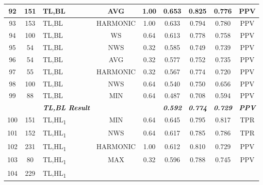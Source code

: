 \begin{table}[H]
{\begin{tabular}{cc|l|cc|c|c|c|c|}
  \multicolumn{1}{|c|}{92} &
    151 &
    TL,BL &
    \multicolumn{1}{c|}{AVG} &
    1.00 &
    0.653 &
    0.825 &
    0.776 &
    PPV \\ \hline
  \multicolumn{1}{|c|}{93} &
    153 &
    TL,BL &
    \multicolumn{1}{c|}{HARMONIC} &
    1.00 &
    0.633 &
    0.794 &
    0.780 &
    PPV \\ \hline
  \multicolumn{1}{|c|}{94} &
    100 &
    TL,BL &
    \multicolumn{1}{c|}{WS} &
    0.64 &
    0.613 &
    0.778 &
    0.758 &
    PPV \\ \hline
  \multicolumn{1}{|c|}{95} &
    54 &
    TL,BL &
    \multicolumn{1}{c|}{NWS} &
    0.32 &
    0.585 &
    0.749 &
    0.739 &
    PPV \\ \hline
  \multicolumn{1}{|c|}{96} &
    54 &
    TL,BL &
    \multicolumn{1}{c|}{AVG} &
    0.32 &
    0.577 &
    0.752 &
    0.735 &
    PPV \\ \hline
  \multicolumn{1}{|c|}{97} &
    55 &
    TL,BL &
    \multicolumn{1}{c|}{HARMONIC} &
    0.32 &
    0.567 &
    0.774 &
    0.720 &
    PPV \\ \hline
  \multicolumn{1}{|c|}{98} &
    100 &
    TL,BL &
    \multicolumn{1}{c|}{NWS} &
    0.64 &
    0.540 &
    0.750 &
    0.656 &
    PPV \\ \hline
  \multicolumn{1}{|c|}{99} &
    88 &
    TL,BL &
    \multicolumn{1}{c|}{MIN} &
    0.64 &
    0.487 &
    0.708 &
    0.594 &
    PPV \\ \hline
   &
     &
    \textit{\textbf{TL,BL Result}} &
     &
     &
    \textit{\textbf{0.592}} &
    \textit{\textbf{0.774}} &
    \textit{\textbf{0.729}} &
    \textit{\textbf{PPV}} \\ \hline
  \multicolumn{1}{|c|}{100} &
    151 &
    TL,HL\textsubscript{1} &
    \multicolumn{1}{c|}{MIN} &
    0.64 &
    0.645 &
    0.795 &
    0.817 &
    TPR \\ \hline
  \multicolumn{1}{|c|}{101} &
    152 &
    TL,HL\textsubscript{1} &
    \multicolumn{1}{c|}{NWS} &
    0.64 &
    0.617 &
    0.785 &
    0.786 &
    TPR \\ \hline
  \multicolumn{1}{|c|}{102} &
    231 &
    TL,HL\textsubscript{1} &
    \multicolumn{1}{c|}{HARMONIC} &
    1.00 &
    0.612 &
    0.810 &
    0.729 &
    PPV \\ \hline
  \multicolumn{1}{|c|}{103} &
    80 &
    TL,HL\textsubscript{1} &
    \multicolumn{1}{c|}{MAX} &
    0.32 &
    0.596 &
    0.788 &
    0.745 &
    PPV \\ \hline
  \multicolumn{1}{|c|}{104} &
    229 &
    TL,HL\textsubscript{1} &

\end{tabular}}
\end{table}
